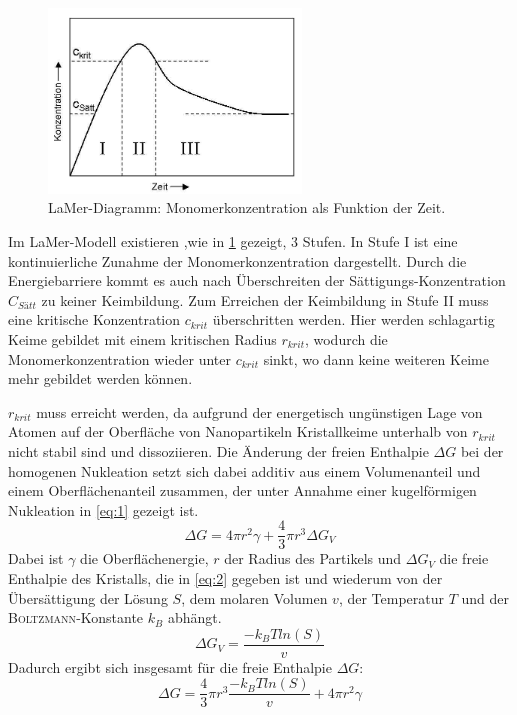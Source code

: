 	\begin{figure}[H]
		\centering
		\includegraphics[width=0.6\textwidth]{Bilder/LaMer} 	
		\caption{LaMer-Diagramm: Monomerkonzentration als Funktion der Zeit.\autocite{Lamer1950}}
		\label{fig:LaMer}
	\end{figure}

	Im LaMer-Modell existieren ,wie in \cref{fig:LaMer} gezeigt, 3 Stufen. 
	In Stufe I ist eine kontinuierliche Zunahme der Monomerkonzentration dargestellt.
	Durch die Energiebarriere kommt es auch nach Überschreiten der Sättigungs-Konzentration $C_{Sätt}$ zu keiner Keimbildung.
	Zum Erreichen der Keimbildung in Stufe II muss eine kritische Konzentration $c_{krit}$ überschritten werden.
	Hier werden schlagartig Keime gebildet mit einem kritischen Radius $r_{krit}$, wodurch die Monomerkonzentration wieder unter $c_{krit}$ sinkt, wo dann keine weiteren Keime mehr gebildet werden können.
	
	$r_{krit}$ muss erreicht werden, da aufgrund der energetisch ungünstigen Lage von Atomen auf der Oberfläche von Nanopartikeln Kristallkeime unterhalb von $r_{krit}$ nicht stabil sind und dissoziieren.
	Die Änderung der freien Enthalpie $\Delta G$ bei der homogenen Nukleation setzt sich dabei additiv aus einem Volumenanteil und einem Oberflächenanteil zusammen, der unter Annahme einer kugelförmigen Nukleation in \cref{eq:1} gezeigt ist.\autocite{Thanh2014}
	\begin{equation}
	\label{eq:1}
	\Delta G = 4 \pi r^2 \gamma + \dfrac{4}{3} \pi r^3 \Delta G_V
	\end{equation}
	Dabei ist $\gamma$ die Oberflächenergie, $r$ der Radius des Partikels und $\Delta G_V$ die freie Enthalpie des Kristalls, die in \cref{eq:2} gegeben ist und wiederum von der Übersättigung der Lösung $S$, dem molaren Volumen $v$, der Temperatur $T$ und der \textsc{Boltzmann}-Konstante $k_B$ abhängt.
	\begin{equation}
	\label{eq:2}
	\Delta G_V = \dfrac{-k_B T ln(S)}{v}
	\end{equation}
	Dadurch ergibt sich insgesamt für die freie Enthalpie $\Delta G$:
	\begin{equation}
	\Delta G = \dfrac{4}{3} \pi r^3 \dfrac{-k_B T ln(S)}{v}+4 \pi r^2 \gamma
	\end{equation}
	 
